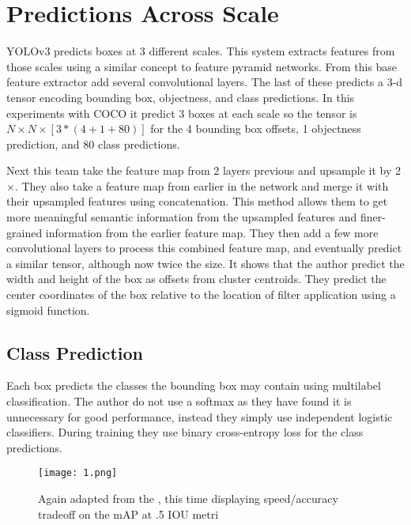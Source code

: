 \documentclass[10pt,twocolumn,letterpaper]{article}
\begin{document}
\section{Predictions Across Scale}
YOLOv3 predicts boxes at 3 different scales. This system extracts features from those scales using a similar concept to feature pyramid networks. From this base feature extractor add several convolutional layers. The last of these predicts a 3-d tensor encoding bounding box, objectness, and class predictions. In this experiments with COCO  it predict 3 boxes at each scale so the tensor is $N\times N\times [3\ast(4+1+80)]$ for the 4 bounding box offsets, 1 objectness prediction, and 80 class predictions.	 
\par 
Next this team take the feature map from 2 layers previous and upsample it by 2$\times$. They also take a feature map from earlier in the network and merge it with their upsampled features using concatenation. This method allows them to get more meaningful semantic information from the upsampled features and finer-grained information from the earlier feature map. They then add a few more convolutional layers to process this combined feature map, and eventually predict a similar tensor, although now twice the size\cite{Redmon2017YOLO9000}. It shows that the author predict the width and height of the box as offsets
from cluster centroids. They predict the center coordinates of the box relative to the location of filter application using a sigmoid function.
\subsection{Class Prediction}
Each box predicts the classes the bounding box may contain using multilabel classification. The author do not use a softmax as they have found it is unnecessary for good performance, instead they simply use independent logistic classifiers. During training they use binary cross-entropy loss for the class
predictions.
\par 
\begin{figure*}
	\begin{center}
		\texttt{[image: 1.png]}\\
		\caption{Again adapted from the \cite{Lin2017Focal}, this time displaying speed/accuracy tradeoff on the mAP at .5 IOU metri}\label{1}
	\end{center}
\end{figure*}
\end{document}
